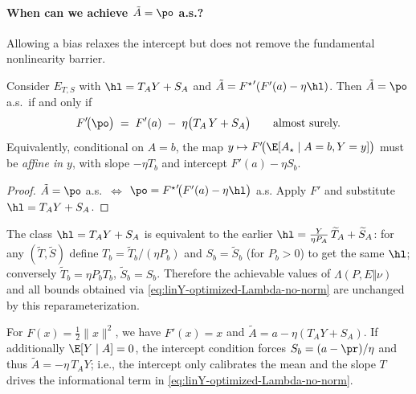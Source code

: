 \paragraph{When can we achieve $\tilde{A}=\po$ a.s.?}
Allowing a bias relaxes the intercept but does not remove the fundamental
nonlinearity barrier.

\begin{proposition}
    \label{prop:linY-iff-no-norm}
    Consider $E_{T,S}$ with $\hl=T_A Y + S_A$ and
    $\tilde{A}={F^\star}'(F'(a)-\eta \hl)$. Then $\tilde{A}=\po$ a.s.\ if and only if
    \begin{equation}
        \label{eq:affine-dual-linY-no-norm}
        F'\!\big(\po\big)
        \;=\;
        F'(a) \;-\; \eta\big(T_A\,Y + S_A\big)
        \qquad\text{almost surely.}
    \end{equation}
    Equivalently, conditional on $A=b$, the map
    $y\mapsto F'\!\big(\E[A_\star\mid A=b,Y=y]\big)$ must be \emph{affine in $y$},
    with slope $-\eta T_b$ and intercept $F'(a)-\eta S_b$.
\end{proposition}

\begin{proof}
    $\tilde{A}=\po$ a.s.\ $\iff$
    $\po={F^\star}'\!\big(F'(a)-\eta \hl\big)$ a.s.  Apply $F'$ and substitute
    $\hl=T_A Y + S_A$.
\end{proof}

\begin{remark}
    \label{rem:linY-absorb}
    The class $\hl=T_A Y+S_A$ is equivalent to the earlier
    $\hl=\frac{Y}{\eta P_A}\,\widetilde{T}_A+\widetilde{S}_A$:
    for any $(\widetilde{T},\widetilde{S})$ define
    $T_b=\widetilde{T}_b/(\eta P_b)$ and $S_b=\widetilde{S}_b$ (for $P_b>0$) to get
    the same $\hl$; conversely $\widetilde{T}_b=\eta P_b T_b$,
    $\widetilde{S}_b=S_b$.  Therefore the achievable values of
    $\Lambda(P,E\Vert \nu)$ and all bounds obtained via
    \eqref{eq:linY-optimized-Lambda-no-norm} are unchanged by this reparameterization.
\end{remark}

\begin{remark}
    For $F(x)=\frac12\|x\|^2$, we have $F'(x)=x$ and
    $\tilde{A}=a-\eta(T_A Y+S_A)$.  If additionally $\E[Y\mid A]=0$, the
    intercept condition forces $S_b=(a-\pr)/\eta$ and thus
    $\tilde{A}=-\eta\,T_A Y$; i.e., the intercept only calibrates the mean and the
    slope $T$ drives the informational term in
    \eqref{eq:linY-optimized-Lambda-no-norm}.
\end{remark}

